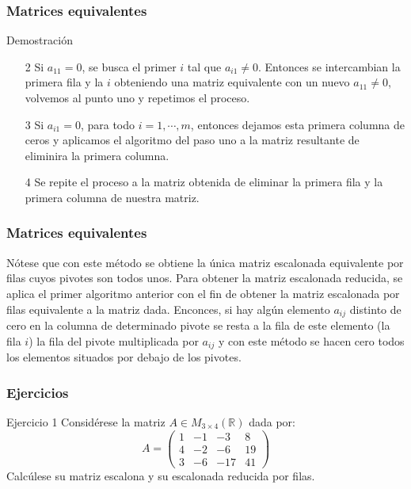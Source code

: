 \documentclass[12pt]{article}
\begin{document}
 \begin{frame}
  \frametitle{Matrices equivalentes}
 \begin{block}{Demostraci\'on}
\begin{itemize}
\item[2] Si $a_{11}= 0$, se busca el primer $i$ tal que $a_{i1}\neq 0$. Entonces se intercambian la primera fila y la $i$ obteniendo una matriz equivalente con un nuevo $a_{11} \neq 0$, volvemos al punto uno y repetimos el proceso.
\item[3] Si $a_{i1}= 0$,  para todo $i=1,\cdots,m$, entonces dejamos esta primera columna de ceros y aplicamos el algoritmo del paso uno a la matriz resultante de eliminira la primera columna.\item[4] Se repite el proceso a la matriz obtenida de eliminar la primera fila y la primera columna de nuestra matriz.
\end{itemize}
\end{block}
\end{frame} 
  
  
   \begin{frame}
  \frametitle{Matrices equivalentes}
N\'otese que con este m\'etodo se obtiene la \'unica matriz escalonada equivalente por filas cuyos pivotes son todos unos. Para obtener la matriz escalonada reducida, se aplica el primer algoritmo anterior con el fin de obtener la matriz escalonada por filas equivalente a la matriz dada. Enconces, si hay alg\'un elemento $a_{ij}$ distinto de cero en la columna de determinado pivote se resta a la fila de este elemento (la fila $i$) la fila del pivote multiplicada por $a_{ij}$ y con este m\'etodo se hacen cero todos los elementos situados por debajo de los pivotes.
\end{frame} 
  
  
  
   \begin{frame}
  \frametitle{Ejercicios}
   \begin{block}{Ejercicio 1}
Consid\'erese la matriz $A\in M_{3\times 4}(\mathbb{R})$ dada por:
\[A= \left(\begin{array}{cccc}1 & -1 & -3 & 8 \\4 & -2 & -6 & 19 \\3 & -6 & -17 & 41\end{array}\right)\]
Calc\'ulese su matriz escalona y su escalonada reducida por filas. 
\end{block}
  \end{frame} 
  
\end{document}
